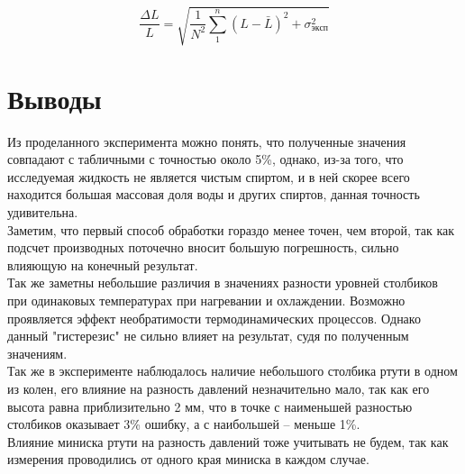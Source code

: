 \begin{equation*}
\frac{\Delta L}{L} = \sqrt{\frac{1}{N^2}\sum\limits_1^n{(L-\bar{L})^2}+\sigma_{эксп}^2}
\end{equation*}
 \section{Выводы}
 
Из проделанного эксперимента можно понять, что полученные значения совпадают с табличными с точностью около 5\%, однако, из-за того, что исследуемая жидкость не является чистым спиртом, и в ней скорее всего находится большая массовая доля воды и других спиртов, данная точность удивительна. \\
Заметим, что первый способ обработки гораздо менее точен, чем второй, так как подсчет производных поточечно вносит большую погрешность, сильно влияющую на конечный результат. \\
Так же заметны небольшие различия в значениях разности уровней столбиков при одинаковых температурах при нагревании и охлаждении. Возможно проявляется эффект необратимости термодинамических процессов. Однако данный "гистерезис" не сильно влияет на результат, судя по полученным значениям. \\
Так же в эксперименте  наблюдалось наличие небольшого столбика ртути в одном из колен, его влияние на разность давлений незначительно мало, так как его высота равна приблизительно 2 мм, что в точке с наименьшей разностью столбиков оказывает 3\% ошибку, а с наибольшей -- меньше 1\%. \\
Влияние миниска ртути на разность давлений тоже учитывать не будем, так как измерения проводились от одного края миниска в каждом случае. \\



